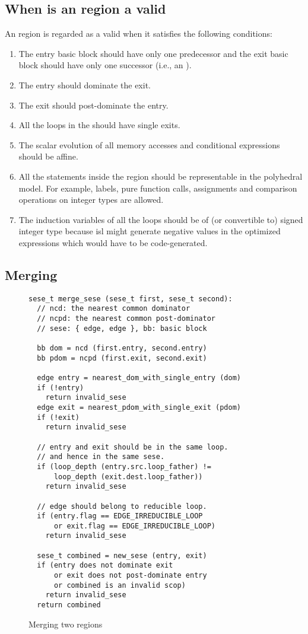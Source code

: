 \documentclass{sig-alternate}
\begin{document}
\subsection{When is an \SESE{} region a valid }
\label{subsec:validity}
An \SESE{} region is regarded as a valid \SCoP{} when it satisfies the following
conditions:
\begin{enumerate}
\item The entry basic block should have only one predecessor and the exit
  basic block should have only one successor (i.e., an \SESE{}).
\item The entry should dominate the exit.
\item The exit should post-dominate the entry.
\item All the loops in the \SESE{} should have single exits.
\item The scalar evolution of all memory accesses and conditional expressions
  should be affine.
\item All the statements inside the region should be representable in the
  polyhedral model.  For example, labels, pure function calls, assignments and
  comparison operations on integer types are allowed.
\item The induction variables of all the loops should be of (or convertible to)
  signed integer type because isl might generate negative values in the optimized
  expressions which would have to be code-generated.
\end{enumerate}

\subsection{Merging }
\label{subsec:merge-sese}

\begin{figure}
\begin{verbatim}
sese_t merge_sese (sese_t first, sese_t second):
  // ncd: the nearest common dominator
  // ncpd: the nearest common post-dominator
  // sese: { edge, edge }, bb: basic block

  bb dom = ncd (first.entry, second.entry)
  bb pdom = ncpd (first.exit, second.exit)

  edge entry = nearest_dom_with_single_entry (dom)
  if (!entry)
    return invalid_sese
  edge exit = nearest_pdom_with_single_exit (pdom)
  if (!exit)
    return invalid_sese

  // entry and exit should be in the same loop.
  // and hence in the same sese.
  if (loop_depth (entry.src.loop_father) !=
      loop_depth (exit.dest.loop_father))
    return invalid_sese

  // edge should belong to reducible loop.
  if (entry.flag == EDGE_IRREDUCIBLE_LOOP
      or exit.flag == EDGE_IRREDUCIBLE_LOOP)
    return invalid_sese

  sese_t combined = new_sese (entry, exit)
  if (entry does not dominate exit
      or exit does not post-dominate entry
      or combined is an invalid scop)
    return invalid_sese
  return combined
\end{verbatim}
\caption{Merging two \SESE{} regions}
\label{fig:merge-sese}
\end{figure}
\end{document}
